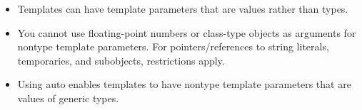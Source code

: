 
\begin{itemize}
\item 
Templates can have template parameters that are values rather than types.

\item 
You cannot use floating-point numbers or class-type objects as arguments for nontype template parameters. For pointers/references to string literals, temporaries, and subobjects, restrictions apply.

\item 
Using auto enables templates to have nontype template parameters that are values of generic types.
\end{itemize}